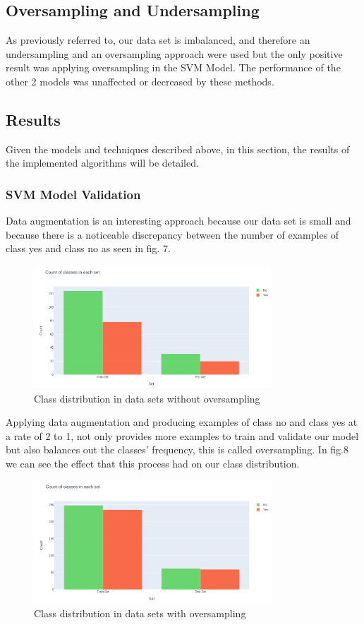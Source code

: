 \documentclass[conference]{IEEEtran}
\begin{document}
\subsection{Oversampling and Undersampling}

As previously referred to, our data set is imbalanced, and therefore an undersampling and an oversampling approach were used but the only positive result was applying oversampling in the SVM Model. The performance of the other 2 models was unaffected or decreased by these methods.

\subsection{Results}

Given the models and techniques described above, in this section, the results of the implemented algorithms will be detailed.

\subsubsection{SVM Model Validation}

Data augmentation is an interesting approach because our data set is small and because there is a noticeable discrepancy between the number of examples of class yes and class no as seen in fig. 7.

\begin{figure}[H]
    \centering
    \includegraphics[width=3.5in]{SVM_classdistribution_begining.png}
    \caption{Class distribution in data sets without oversampling}\label{fig:fig6}
\end{figure}

Applying data augmentation and producing examples of class no and class yes at a rate of 2 to 1, not only provides more examples to train and validate our model but also balances out the classes' frequency, this is called oversampling. In fig.8 we can see the effect that this process had on our class distribution.

\begin{figure}[H]
    \centering
    \includegraphics[width=3.5in]{SVM_classdistribution_oversamp.png}
    \caption{Class distribution in data sets with oversampling}\label{fig:fig7}
\end{figure}
\end{document}
